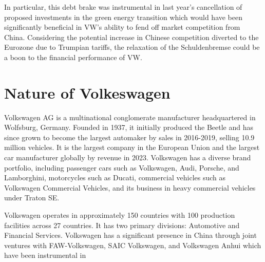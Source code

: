 \documentclass[10pt]{article}
\begin{document}
In particular, this debt brake was instrumental in last year's  cancellation of proposed investments in the green energy transition which would have been significantly beneficial in VW's ability to fend off market competition from China. Considering the potential increase in Chinese competition diverted to the Eurozone due to Trumpian tariffs, the relaxation of the Schuldenbremse could be a boon to the financial performance of VW.

\newpage

\section {Nature of Volkeswagen}


Volkswagen AG is a multinational conglomerate manufacturer headquartered in Wolfsburg, Germany. Founded in 1937, it initially produced the Beetle and has since grown to become the largest automaker by sales in 2016-2019, selling 10.9 million vehicles. It is the largest company in the European Union and the largest car manufacturer globally by revenue in 2023. Volkswagen has a diverse brand portfolio, including passenger cars such as Volkswagen, Audi, Porsche, and Lamborghini, motorcycles such as Ducati, commercial vehicles such as Volkswagen Commercial Vehicles, and its business in heavy commercial vehicles under Traton SE.

Volkswagen operates in approximately 150 countries with 100 production facilities across 27 countries. It has two primary divisions: Automotive and Financial Services. Volkswagen has a significant presence in China through joint ventures with FAW-Volkswagen, SAIC Volkswagen, and Volkswagen Anhui which have been instrumental in
\end{document}
